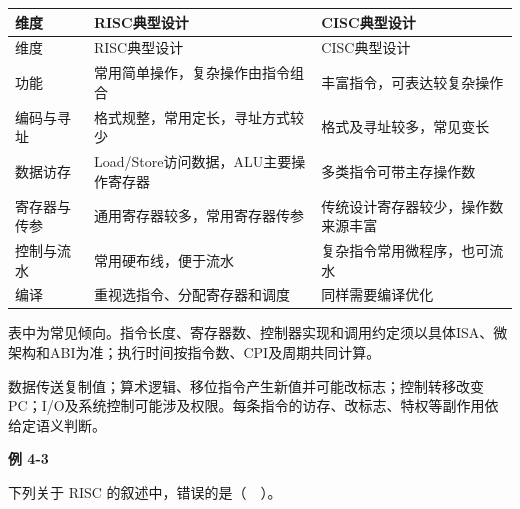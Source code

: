 \par\smallskip
\begin{wideblock}
{\fontsize{9.3}{12}\selectfont\setlength{\tabcolsep}{2.5pt}\setlength{\LTleft}{0pt}\setlength{\LTright}{0pt}
\begin{longtable}{@{}>{\raggedright\arraybackslash}p{}>{\raggedright\arraybackslash}p{}>{\raggedright\arraybackslash}p{}@{}}
\toprule
维度 & RISC典型设计 & CISC典型设计 \\

\midrule\endfirsthead\toprule
维度 & RISC典型设计 & CISC典型设计 \\

\midrule\endhead\bottomrule\endfoot
功能 & 常用简单操作，复杂操作由指令组合 & 丰富指令，可表达较复杂操作 \\

编码与寻址 & 格式规整，常用定长，寻址方式较少 & 格式及寻址较多，常见变长 \\

数据访存 & Load/Store访问数据，ALU主要操作寄存器 & 多类指令可带主存操作数 \\

寄存器与传参 & 通用寄存器较多，常用寄存器传参 & 传统设计寄存器较少，操作数来源丰富 \\

控制与流水 & 常用硬布线，便于流水 & 复杂指令常用微程序，也可流水 \\

编译 & 重视选指令、分配寄存器和调度 & 同样需要编译优化 \\

\end{longtable}}
\end{wideblock}
\par\smallskip

表中为常见倾向。指令长度、寄存器数、控制器实现和调用约定须以具体ISA、微架构和ABI为准；执行时间按指令数、CPI及周期共同计算。

数据传送复制值；算术逻辑、移位指令产生新值并可能改标志；控制转移改变PC；I/O及系统控制可能涉及权限。每条指令的访存、改标志、特权等副作用依给定语义判断。

\par\medskip{}\noindent\hypertarget{CO04-E03}{}\label{CO04-E03}\textbf{例 4-3}\par\nobreak\smallskip

下列关于 RISC 的叙述中，错误的是（　）。

